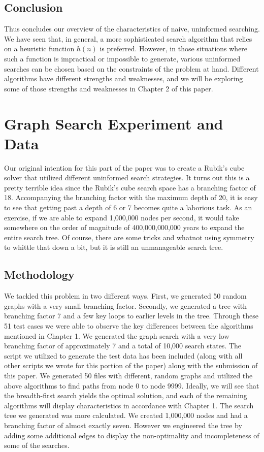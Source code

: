 \documentclass[a4paper,11pt]{report}
\begin{document}
\section{Conclusion}
Thus concludes our overview of the characteristics of naive, uninformed
searching.  We have seen that, in general, a more sophisticated search
algorithm that relies on a heuristic function $h(n)$ is preferred.  However, in
those situations where such a function is impractical or impossible to
generate, various uninformed searches can be chosen based on the constraints of
the problem at hand.  Different algorithms have different strengths and
weaknesses, and we will be exploring some of those strengths and weaknesses in
Chapter 2 of this paper.

\chapter{Graph Search Experiment and Data}
Our original intention for this part of the paper was to create a Rubik's cube
solver that utilized different uninformed search strategies.  It turns out this
is a pretty terrible idea since the Rubik's cube search space has a branching
factor of 18. Accompanying the branching factor with the maximum depth of 20,
it is easy to see that getting past a depth of 6 or 7 becomes quite a laborious
task. As an exercise, if we are able to expand 1,000,000 nodes per second, it
would take somewhere on the order of magnitude of 400,000,000,000 years to
expand the entire search tree.  Of course, there are some tricks and whatnot
using symmetry to whittle that down a bit, but it is still an unmanageable
search tree.\newline

\section{Methodology}
We tackled this problem in two different ways.  First, we generated 50 random
graphs with a very small branching factor.  Secondly, we generated a tree with
branching factor 7 and a few key loops to earlier levels in the tree.  Through
these 51 test cases we were able to observe the key differences between the
algorithms mentioned in Chapter 1.  We generated the graph search with a very
low branching factor of approximately 7 and a total of 10,000 search states.
The script we utilized to generate the test data has been included (along with
all other scripts we wrote for this portion of the paper)
along with the submission of this paper.  We generated 50 files with different,
random graphs and utilized the above algorithms to find paths from node 0 to
node 9999.  Ideally, we will see that the breadth-first search yields the
optimal solution, and each of the remaining algorithms will display
characteristics in accordance with Chapter 1. The search tree we generated was
more calculated. We created 1,000,000 nodes and had a branching factor of
almost exactly seven.  However we engineered the tree by adding some additional
edges to display the non-optimality and incompleteness of some of the searches.
\end{document}
